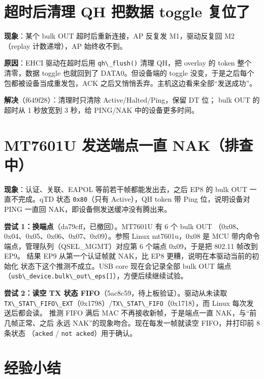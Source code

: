 \section{超时后清理 QH 把数据 toggle
复位了}\label{ux8d85ux65f6ux540eux6e05ux7406-qh-ux628aux6570ux636e-toggle-ux590dux4f4dux4e86}

\textbf{现象}：某个 bulk OUT 超时后重新连接，AP 反复发 M1，驱动反复回 M2
（replay 计数递增），AP 始终收不到。

\textbf{原因}：EHCI 驱动在超时后用 \passthrough{\lstinline!qh\_flush()!}
清理 QH，把 overlay 的 token 整个 清零，数据 toggle 也就回到了
DATA0。但设备端的 toggle 没变，于是之后每个 包都被设备当成重发包，ACK
之后又悄悄丢弃。主机这边看来全部``发送成功''。

\textbf{解决}（f649f28）：清理时只清除 Active/Halted/Ping，保留 DT 位；
bulk OUT 的超时从 1 秒放宽到 3 秒，给 PING/NAK 中的设备更多时间。

\section{MT7601U 发送端点一直
NAK（排查中）}\label{mt7601u-ux53d1ux9001ux7aefux70b9ux4e00ux76f4-nakux6392ux67e5ux4e2d}

\textbf{现象}：认证、关联、EAPOL 等前若干帧都能发出去，之后 EP8 的 bulk
OUT 一直不完成。qTD 状态 \passthrough{\lstinline!0x80!}（只有
Active），QH token 带 Ping 位，说明设备对 PING 一直回
NAK，即设备侧发送缓冲没有腾出来。

\textbf{尝试 1：换端点}（da79cff，已撤回）。MT7601U 有 6 个 bulk OUT
（0x08、0x04、0x05、0x06、0x07、0x09）。参照 Linux mt7601u，0x08 是 MCU
带内命令 端点，管理队列（QSEL\_MGMT）对应第 6 个端点 0x09，于是把 802.11
帧改到 EP9。 结果 EP9 从第一个认证帧就 NAK，比 EP8
更糟，说明在本驱动当前的初始化 状态下这个推测不成立。USB core
现在会记录全部 bulk OUT 端点
（\passthrough{\lstinline!usb\_device.bulk\_out\_eps[]!}），方便后续继续试验。

\textbf{尝试 2：读空 TX 状态 FIFO}（5ac8c59，待上板验证）。驱动从未读取
\passthrough{\lstinline!TX\_STAT\_FIFO\_EXT!}（0x1798）/\passthrough{\lstinline!TX\_STAT\_FIFO!}（0x1718），而
Linux 每次发送后都会读。 推测 FIFO 满后 MAC 不再接收新帧，于是端点一直
NAK，与``前几帧正常、之后 永远 NAK''的现象吻合。现在每发一帧就读空
FIFO，并打印前 8 条状态 （\passthrough{\lstinline!acked!} /
\passthrough{\lstinline!not acked!}）用于确认。

\section{经验小结}\label{ux7ecfux9a8cux5c0fux7ed3}


